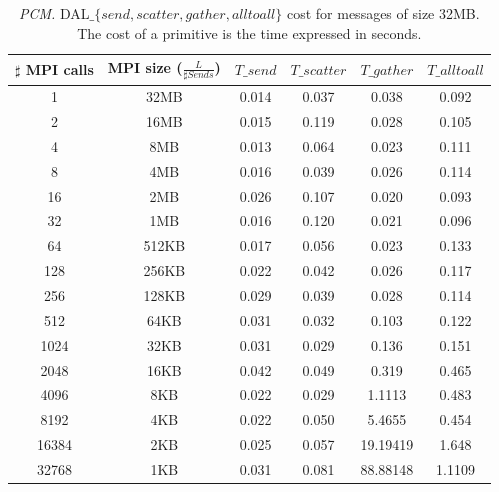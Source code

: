 \begin{table}[h]
\begin{center}
\begin{tabular}{|c|c|c|c|c|c|}\hline
\hline
$\sharp$ MPI calls & MPI size ($\frac{L}{\sharp Sends}$)  & $T\_send$   & $T\_scatter$  & $T\_gather$ & $T\_alltoall$      \\\hline\hline
1 & 32MB & 0.014 & 0.037 & 0.038 & 0.092 \\\hline
2 & 16MB & 0.015 & 0.119 & 0.028 & 0.105 \\\hline
4 & 8MB & 0.013 & 0.064 & 0.023 & 0.111 \\\hline
8 & 4MB & 0.016 & 0.039 & 0.026 & 0.114 \\\hline
16 & 2MB & 0.026 & 0.107 & 0.020 & 0.093 \\\hline
32 & 1MB & 0.016 & 0.120 & 0.021 & 0.096 \\\hline
64 & 512KB & 0.017 & 0.056 & 0.023 & 0.133 \\\hline
128 & 256KB & 0.022 & 0.042 & 0.026 & 0.117 \\\hline
256 & 128KB & 0.029 & 0.039 & 0.028 & 0.114 \\\hline
512 & 64KB & 0.031 & 0.032 & 0.103 & 0.122 \\\hline
1024 & 32KB & 0.031 & 0.029 & 0.136 & 0.151 \\\hline
2048 & 16KB & 0.042 & 0.049 & 0.319 & 0.465 \\\hline
4096 & 8KB & 0.022 & 0.029 & 1.1113 & 0.483 \\\hline
8192 & 4KB & 0.022 & 0.050 & 5.4655 & 0.454 \\\hline
16384 & 2KB & 0.025 & 0.057 & 19.19419 & 1.648 \\\hline
32768 & 1KB & 0.031 & 0.081 & 88.88148 & 1.1109 \\\hline
\end{tabular}
\caption{\textit{PCM.} DAL$\_\lbrace send, scatter, gather, alltoall \rbrace$ cost for messages of size 32MB. The cost of a primitive is the time expressed in seconds. }
\label{tsetup-pcm-n64-M32}
\end{center}
\end{table}

